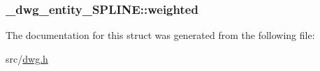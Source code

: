 \hypertarget{struct__dwg__entity__SPLINE_a2e6ef45af2fae230a8b2889ad6ca0c13}{
\subsubsection[{weighted}]{ {\bf \-\_\-dwg\-\_\-entity\-\_\-\-S\-P\-L\-I\-N\-E\-::weighted}}}\label{struct__dwg__entity__SPLINE_a2e6ef45af2fae230a8b2889ad6ca0c13}


\-The documentation for this struct was generated from the following file\-:\begin{DoxyCompactItemize}
\item 
src/\hyperlink{dwg_8h}{dwg.\-h}\end{DoxyCompactItemize}
